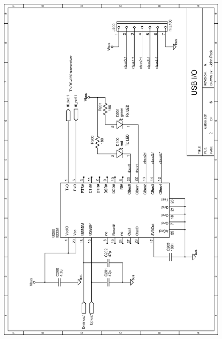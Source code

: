 \begin{figure}[ht]
    \begin{center}
          \vspace{0.4cm}
          \includegraphics[clip,height=\textheight]
          {schematics/usb/usbio}
          \label{sch:usbio}
    \end{center} 
\end{figure}

